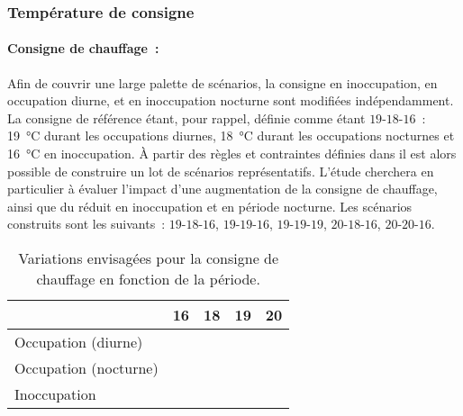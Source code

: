 \subsubsection{Température de consigne} %
\label{ssub:temperature_de_consigne}
\paragraph{Consigne de chauffage~:} %
\label{par:consigne_de_chauffage}
Afin de couvrir une large palette de scénarios, la consigne en inoccupation, en occupation
diurne, et en inoccupation nocturne sont modifiées indépendamment. La consigne de
référence étant, pour rappel, définie comme étant $19$-$18$-$16$~: \SI{19}{\celsius} durant les
occupations diurnes, \SI{18}{\celsius} durant les occupations nocturnes et
\SI{16}{\celsius} en inoccupation. À partir des règles et contraintes définies dans
 il est alors possible de construire un lot de scénarios
représentatifs. L’étude cherchera en particulier à évaluer l’impact d’une augmentation de
la consigne de chauffage, ainsi que du réduit en inoccupation et en période
nocturne. Les scénarios construits sont les suivants~: $19$-$18$-$16$, $19$-$19$-$16$, $19$-$19$-$19$,
$20$-$18$-$16$, $20$-$20$-$16$.

\begin{table}
\centering
\caption[Variations envisagées pour la consigne de chauffage en fonction de la période]
        {Variations envisagées pour la consigne de chauffage en fonction de la période.}
\label{tab:consigne_chauffage}
\begin{tabular}{l c c c c}
    \toprule
                           & \textbf{\num{16}}                     & \textbf{\num{18}}                     & \textbf{\num{19}}                     & \textbf{\num{20}}              \\
    \midrule
    Occupation (diurne)    &                             &                             & \cellcolor{SolarizedBrBlue} & \cellcolor{SolarizedBrBlue} \\
    Occupation (nocturne)  &                             & \cellcolor{SolarizedBrBlue} & \cellcolor{SolarizedBrBlue} & \cellcolor{SolarizedBrBlue} \\
    Inoccupation           & \cellcolor{SolarizedBrBlue} &                             & \cellcolor{SolarizedBrBlue} &                     \\
    \bottomrule
\end{tabular}
\end{table}


